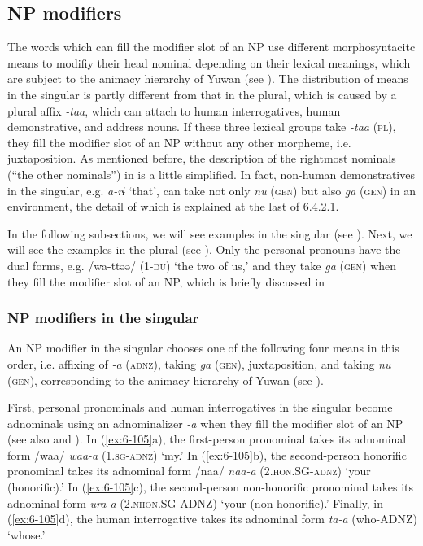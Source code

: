 \begin{table}
\subsection{NP modifiers}

The words which can fill the modifier slot of an NP use different morphosyntacitc means to modifiy their head nominal depending on their lexical meanings, which are subject to the animacy hierarchy of Yuwan (see ). The distribution of means in the singular is partly different from that in the plural, which is caused by a plural affix \textit{-taa}, which can attach to human interrogatives, human demonstrative, and address nouns. If these three lexical groups take \textit{-taa} (\textsc{pl}), they fill the modifier slot of an NP without any other morpheme, i.e. juxtaposition. As mentioned before, the description of the rightmost nominals (“the other nominals”) in  is a little simplified. In fact, non-human demonstratives in the singular, e.g. \textit{a-rɨ} ‘that’, can take not only \textit{nu} (\textsc{gen}) but also \textit{ga} (\textsc{gen}) in an environment, the detail of which is explained at the last of 6.4.2.1.

In the following subsections, we will see examples in the singular (see ). Next, we will see the examples in the plural (see ). Only the personal pronouns have the dual forms, e.g. /wa-ttəə/ (1-\textsc{du}) ‘the two of us,’ and they take \textit{ga} (\textsc{gen}) when they fill the modifier slot of an NP, which is briefly discussed in 

\subsubsection{NP modifiers in the singular}

An NP modifier in the singular chooses one of the following four means in this order, i.e. affixing of \textit{-a} (\textsc{adnz}), taking \textit{ga} (\textsc{gen}), juxtaposition, and taking \textit{nu} (\textsc{gen}), corresponding to the animacy hierarchy of Yuwan (see ).

First, personal pronominals and human interrogatives in the singular become adnominals using an adnominalizer \textit{-a} when they fill the modifier slot of an NP (see also  and ). In (\ref{ex:6-105}a), the first-person pronominal takes its adnominal form /waa/ \textit{waa-a} (1.\textsc{sg}-\textsc{adnz}) ‘my.’ In (\ref{ex:6-105}b), the second-person honorific pronominal takes its adnominal form /naa/ \textit{naa-a} (2.\textsc{hon}.SG-\textsc{adnz}) ‘your (honorific).’ In (\ref{ex:6-105}c), the second-person non-honorific pronominal takes its adnominal form \textit{ura-a} (2.\textsc{nhon}.SG-ADNZ) ‘your (non-honorific).’ Finally, in (\ref{ex:6-105}d), the human interrogative takes its adnominal form \textit{ta-a} (who-ADNZ) ‘whose.’


\end{table}
